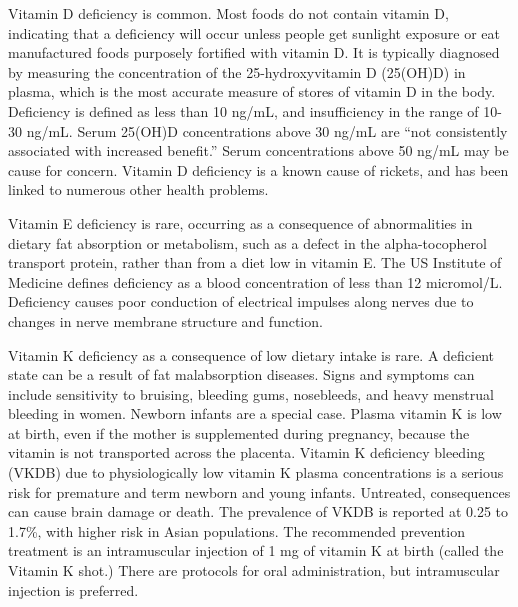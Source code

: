 \documentclass[
  openany]{book}
\begin{document}
Vitamin D deficiency is common. Most foods do not contain vitamin D, indicating that a deficiency will occur unless people get sunlight exposure or eat manufactured foods purposely fortified with vitamin D. It is typically diagnosed by measuring the concentration of the 25-hydroxyvitamin D (25(OH)D) in plasma, which is the most accurate measure of stores of vitamin D in the body. Deficiency is defined as less than 10 ng/mL, and insufficiency in the range of 10-30 ng/mL. Serum 25(OH)D concentrations above 30 ng/mL are ``not consistently associated with increased benefit.'' Serum concentrations above 50 ng/mL may be cause for concern. Vitamin D deficiency is a known cause of rickets, and has been linked to numerous other health problems.

Vitamin E deficiency is rare, occurring as a consequence of abnormalities in dietary fat absorption or metabolism, such as a defect in the alpha-tocopherol transport protein, rather than from a diet low in vitamin E. The US Institute of Medicine defines deficiency as a blood concentration of less than 12 micromol/L. Deficiency causes poor conduction of electrical impulses along nerves due to changes in nerve membrane structure and function.

Vitamin K deficiency as a consequence of low dietary intake is rare. A deficient state can be a result of fat malabsorption diseases. Signs and symptoms can include sensitivity to bruising, bleeding gums, nosebleeds, and heavy menstrual bleeding in women. Newborn infants are a special case. Plasma vitamin K is low at birth, even if the mother is supplemented during pregnancy, because the vitamin is not transported across the placenta. Vitamin K deficiency bleeding (VKDB) due to physiologically low vitamin K plasma concentrations is a serious risk for premature and term newborn and young infants. Untreated, consequences can cause brain damage or death. The prevalence of VKDB is reported at 0.25 to 1.7\%, with higher risk in Asian populations. The recommended prevention treatment is an intramuscular injection of 1 mg of vitamin K at birth (called the Vitamin K shot.) There are protocols for oral administration, but intramuscular injection is preferred.
\end{document}
